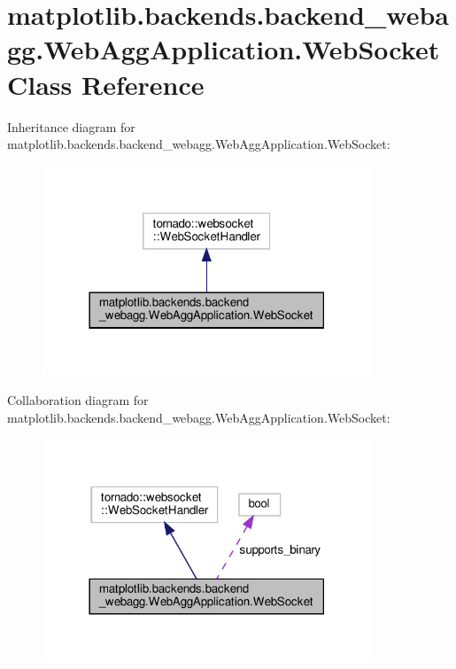 \hypertarget{classmatplotlib_1_1backends_1_1backend__webagg_1_1WebAggApplication_1_1WebSocket}{}\section{matplotlib.\+backends.\+backend\+\_\+webagg.\+Web\+Agg\+Application.\+Web\+Socket Class Reference}
\label{classmatplotlib_1_1backends_1_1backend__webagg_1_1WebAggApplication_1_1WebSocket}


Inheritance diagram for matplotlib.\+backends.\+backend\+\_\+webagg.\+Web\+Agg\+Application.\+Web\+Socket\+:
\nopagebreak
\begin{figure}[H]
\begin{center}
\leavevmode
\includegraphics[width=278pt]{classmatplotlib_1_1backends_1_1backend__webagg_1_1WebAggApplication_1_1WebSocket__inherit__graph}
\end{center}
\end{figure}


Collaboration diagram for matplotlib.\+backends.\+backend\+\_\+webagg.\+Web\+Agg\+Application.\+Web\+Socket\+:
\nopagebreak
\begin{figure}[H]
\begin{center}
\leavevmode
\includegraphics[width=278pt]{classmatplotlib_1_1backends_1_1backend__webagg_1_1WebAggApplication_1_1WebSocket__coll__graph}
\end{center}
\end{figure}
